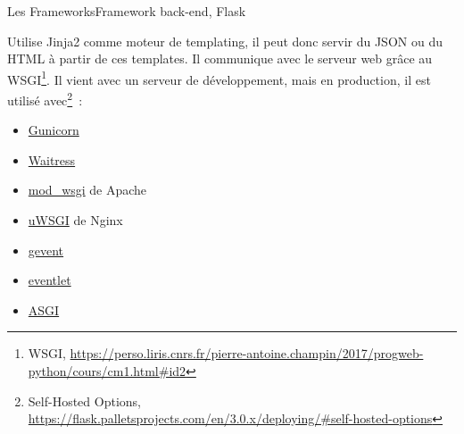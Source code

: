 \documentclass{beamer}
\begin{document}
    \begin{frame}{Les Frameworks}{Framework back-end, Flask}
        \begin{small}
            Utilise Jinja2 comme moteur de templating, il peut donc servir du JSON ou du HTML à partir de ces templates.
            \bigbreak
            Il communique avec le serveur web grâce au WSGI\footnote{WSGI, \url{https://perso.liris.cnrs.fr/pierre-antoine.champin/2017/progweb-python/cours/cm1.html\#id2}}.
            \bigbreak
            Il vient avec un serveur de développement, mais en production, il est utilisé avec\footnote{Self-Hosted Options, \url{https://flask.palletsprojects.com/en/3.0.x/deploying/\#self-hosted-options}}~:
            \begin{itemize}
                \item \href{https://flask.palletsprojects.com/en/3.0.x/deploying/gunicorn/}{Gunicorn}
                \item \href{https://flask.palletsprojects.com/en/3.0.x/deploying/waitress/}{Waitress}
                \item \href{https://flask.palletsprojects.com/en/3.0.x/deploying/mod_wsgi/}{mod\_wsgi} de Apache
                \item \href{https://flask.palletsprojects.com/en/3.0.x/deploying/uwsgi/}{uWSGI} de Nginx
                \item \href{https://flask.palletsprojects.com/en/3.0.x/deploying/gevent/}{gevent}
                \item \href{https://flask.palletsprojects.com/en/3.0.x/deploying/eventlet/}{eventlet}
                \item \href{https://flask.palletsprojects.com/en/3.0.x/deploying/asgi/}{ASGI}
            \end{itemize}
        \end{small}
    \end{frame}
\end{document}
